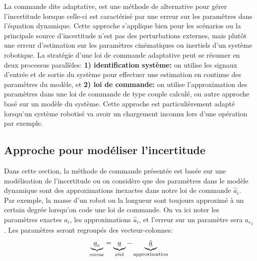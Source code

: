 La commande dite adaptative, est une méthode de alternative pour gérer l'incertitude lorsque celle-ci est caractérisé par une erreur sur les paramètres dans l'équation dynamique. Cette approche s'applique bien pour les scénarios ou la principale source d'incertitude n'est pas des perturbations externes, mais plutôt une erreur d'estimation sur les paramètres cinématiques ou inertiels d'un système robotique. La stratégie d'une loi de commande adaptative peut se résumer en deux processus parallèles: \textbf{1) identification système:} on utilise les signaux d'entrée et de sortie du système pour effectuer une estimation en continue des paramètres du modèle, et \textbf{2) loi de commande: }on utilise l'approximation des paramètres dans une loi de commande de type couple calculé, ou autre approche basé sur un modèle du système. Cette approche est particulièrement adapté lorsqu'un système robotisé va avoir un chargement inconnu lors d'une opération par exemple. 


\subsection{Approche pour modéliser l'incertitude}

Dans cette section, la méthode de commande présentée est basée sur une modélisation de l'incertitude ou on considère que des paramètres dans le modèle dynamique sont des approximations inexactes dans notre loi de commande $\hat{a}_i$. Par exemple, la masse d'un robot ou la longueur sont toujours approximé à un certain degrée lorsqu'on code une loi de commande. On va ici noter les paramètres exactes $a_i$, les approximations $\hat{a}_i$, et l'erreur sur un paramètre sera ${a_e}_i$. Les paramètres seront regroupés des vecteur-colonnes:
\begin{align}
\underbrace{
\underline{a}_e 
}_{\text{erreur}}
= 
\underbrace{
\underline{a}
}_{\text{réel}}
- 
\underbrace{
\underline{\hat{a}}
}_{\text{approximation}}
\end{align}

